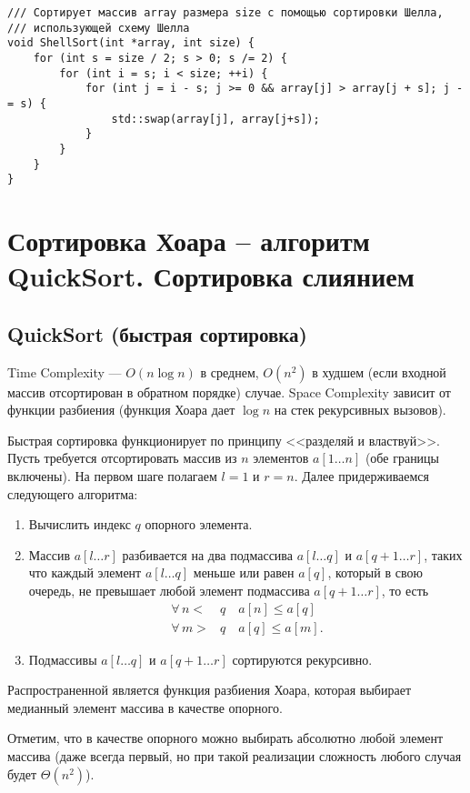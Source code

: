\begin{verbatim}
/// Сортирует массив array размера size с помощью сортировки Шелла,
/// использующей схему Шелла
void ShellSort(int *array, int size) {
    for (int s = size / 2; s > 0; s /= 2) {
        for (int i = s; i < size; ++i) {
            for (int j = i - s; j >= 0 && array[j] > array[j + s]; j -= s) {
                std::swap(array[j], array[j+s]);
            }
        }
    }
}
\end{verbatim}

\section{Сортировка Хоара – алгоритм QuickSort. Сортировка слиянием}
\subsection{QuickSort (быстрая сортировка)}
Time Complexity --- $O(n\log n)$ в среднем, $O(n^2)$
в худшем (если входной массив отсортирован в обратном порядке) случае.
Space Complexity зависит от функции разбиения (функция Хоара дает $\log n$ на стек рекурсивных вызовов).

Быстрая сортировка функционирует по принципу <<разделяй и властвуй>>.
Пусть требуется отсортировать массив из $n$ элементов $a[1\dots n]$ (обе границы включены).
На первом шаге полагаем $l=1$ и $r=n$. Далее придерживаемся следующего алгоритма:
\begin{enumerate}
  \item Вычислить индекс $q$ опорного элемента.
  \item Массив $a[l\dots r]$
  разбивается на два подмассива $a[l\dots q]$ и $a[q+1\dots r]$, таких что каждый элемент $a[l\dots q]$
  меньше или равен $a[q]$, который в свою очередь, не превышает любой элемент подмассива $a[q+1\dots r]$, то есть
  \begin{align*}
    \forall\, n <&q \quad a[n] \leq a[q] \\
    \forall\, m >&q \quad a[q] \leq a[m].
  \end{align*}
  \item Подмассивы $a[l\dots q]$ и $a[q+1\dots r]$ сортируются рекурсивно.
\end{enumerate}

Распространенной является функция разбиения Хоара, которая выбирает медианный элемент массива
в качестве опорного.

Отметим, что в качестве опорного можно выбирать абсолютно любой элемент массива
(даже всегда первый, но при такой реализации сложность любого случая будет $\Theta(n^2)$).


